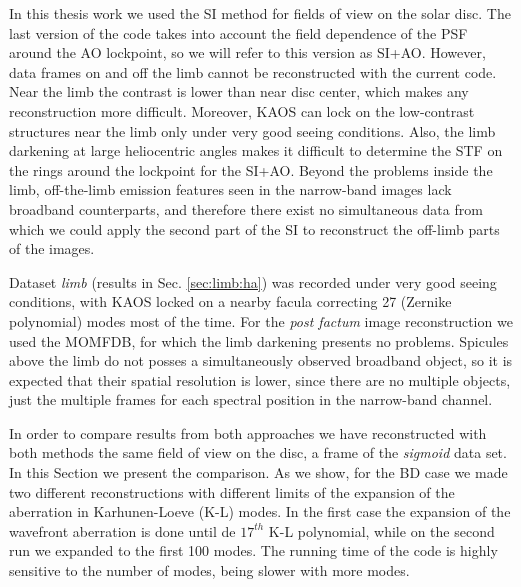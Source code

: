 In this thesis work we used the SI method for fields of view on the solar disc. The last version of the code takes into account the field dependence of the PSF around the AO lockpoint, so we will refer to this version as SI+AO. However, data frames on and off the limb cannot be reconstructed with the current code. Near the limb the contrast is lower than near disc center, which makes any reconstruction more difficult. Moreover, KAOS can lock on the low-contrast structures near the limb only under very good seeing conditions.  Also, the limb darkening at large heliocentric angles makes it difficult to determine the STF on the rings around the lockpoint for the SI+AO. Beyond the problems inside the limb, off-the-limb emission features seen in the narrow-band images lack broadband counterparts, and therefore there exist no simultaneous data from which we could apply the second part of the SI to reconstruct the off-limb parts of the images.

Dataset \emph{limb}  (results in Sec. \ref{sec:limb:ha}) was recorded under very good seeing conditions, with KAOS locked on a nearby facula correcting 27 (Zernike polynomial) modes most of the time. For the {\em post factum} image reconstruction we used the MOMFDB, for which the limb darkening presents no problems. Spicules above the limb do not posses a simultaneously observed  broadband object, so it is expected that their spatial resolution is lower, since there are no multiple objects, just the multiple frames for each spectral position in the narrow-band channel.

In order to compare results from both approaches we have reconstructed with both methods the same field of view on the disc, a frame of the \emph{sigmoid} data set. In this Section we present the comparison. As we show, for the BD case we made two different reconstructions with different limits of the expansion of the aberration in Karhunen-Loeve (K-L) modes. In the first case the expansion of the wavefront aberration is done until de $17^{th}$ K-L polynomial, while on the second run we expanded to the first 100 modes. The running time of the code is highly sensitive to the number of modes, being slower with more modes. 



